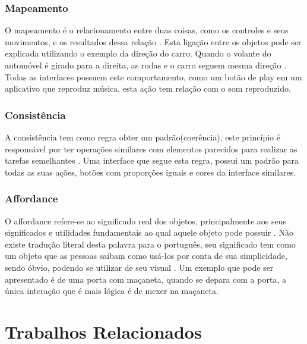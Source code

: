 \documentclass[12pt,oneside,a4paper,chapter=TITLE,section=TITLE,sumario=tradicional]{abntex2}
\begin{document}
\subsection{Mapeamento}
\label{sec:mapeamento}

O mapeamento é o relacionamento entre duas coisas, como os controles e seus movimentos, e os resultados dessa relação \cite{norman2002}. Esta ligação entre os objetos pode ser explicada utilizando o exemplo da direção do carro. Quando o volante do automóvel é girado para a direita, as rodas e o carro seguem mesma direção \cite{norman2002}. Todas as interfaces possuem este comportamento, como um botão de play em um aplicativo que reproduz música, esta ação tem relação com o som reproduzido.

\subsection{Consistência}
\label{sec:consciencia}

A consistência tem como regra obter um padrão(coerência), este princípio é responsável por ter operações similares com elementos parecidos para realizar as tarefas semelhantes \cite{agni2015}. Uma interface que segue esta regra, possui um padrão para todas as suas ações, botões com proporções iguais e cores da interface similares.

\subsection{Affordance}
\label{sec:affordance}

O affordance refere-se ao significado real dos objetos, principalmente aos seus significados e utilidades fundamentais ao qual aquele objeto pode possuir \cite{norman2002}. Não existe tradução literal desta palavra para o português, seu significado tem como um objeto que as pessoas saibam como usá-los por conta de sua simplicidade, sendo óbvio, podendo se utilizar de seu visual \cite{agni2015}. Um exemplo que pode ser apresentado é de uma porta com maçaneta, quando se depara com a porta, a única interação que é mais lógica é de mexer na maçaneta.

\chapter{Trabalhos Relacionados}
\label{cap:trabalhos-relacionados}
\end{document}
